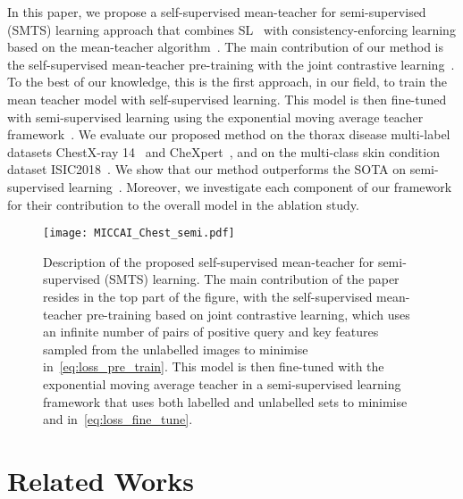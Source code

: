 \documentclass[runningheads]{llncs}
\begin{document}
In this paper, we propose a self-supervised mean-teacher for semi-supervised (SMTS) learning approach that combines SL~\cite{chen2020big,zhai2019s4l} with consistency-enforcing learning based on the mean-teacher algorithm~\cite{tarvainen2017mean}.
The main contribution of our method is the self-supervised mean-teacher pre-training with the joint contrastive learning~\cite{cai2020joint}. To the best of our knowledge, this is the first approach, in our field, to train the mean teacher model with self-supervised learning.
This model is then fine-tuned with semi-supervised learning using the exponential moving average teacher framework~\cite{tarvainen2017mean}.
We evaluate our proposed method on the thorax disease multi-label datasets ChestX-ray 14~\cite{wang2017chestx} and CheXpert~\cite{irvin2019chexpert}, and on the multi-class skin condition dataset ISIC2018~\cite{tschandl2018ham10000, codella2019skin}.
We show that our method outperforms the SOTA on semi-supervised learning~\cite{aviles2019graphx,liu2020semi,gyawali2020semi,unnikrishnan2020semi}. Moreover, we investigate each component of our framework for their contribution to the overall model in the ablation study. 






\begin{figure}[t!]
\begin{center}

\texttt{[image: MICCAI\_Chest\_semi.pdf]}
\end{center}
\vspace{-.5in}
  \caption{Description of the proposed 
  self-supervised mean-teacher for semi-supervised (SMTS) learning.
  The main contribution of the paper resides in the top part of the figure, with the self-supervised mean-teacher pre-training based on joint contrastive learning, which uses an infinite number of pairs of positive query and key features sampled from the unlabelled images to minimise  in~\eqref{eq:loss_pre_train}.
  This model is then fine-tuned with the exponential moving average teacher in a semi-supervised learning framework that uses both labelled and unlabelled sets to minimise  and  in~\eqref{eq:loss_fine_tune}.
} 
\label{fig:framework}
\end{figure}

\vspace{-.1in}
\section{Related Works}
\end{document}
